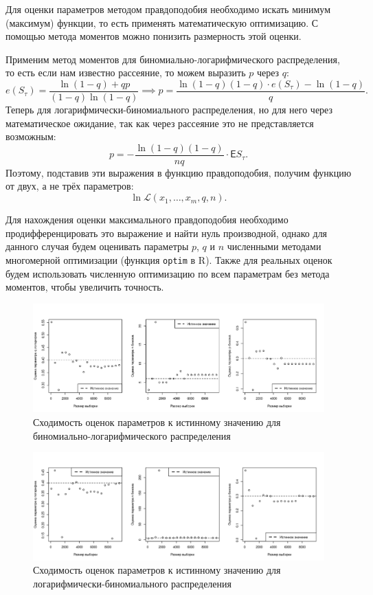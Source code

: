 \documentclass[12pt, specialist, subf, substylefile = spbu.rtx]{disser}
\begin{document}
	Для оценки параметров методом правдоподобия необходимо искать минимум (максимум)  функции, то есть применять математическую оптимизацию. С помощью метода моментов можно понизить размерность этой оценки.
	
	Применим метод моментов для биномиально-логарифмического распределения, то есть если нам известно рассеяние, то можем выразить $ p $ через $ q $:
	\[
		e (S _\tau)=\frac{\ln(1 - q) + q p}{(1-q)\ln(1 - q)} \implies p = \frac {\ln(1 - q) (1 - q) \cdot e(S _\tau) - \ln(1 - q)} {q}.
	\]
	Теперь для логарифмически-биномиального распределения, но для него через математическое ожидание, так как через рассеяние это не представляется возможным:
	\[
		p = -\frac {\ln(1 - q)(1 - q)} {nq} \cdot \mathsf{E} S _\tau.
	\]
	Поэтому, подставив эти выражения в функцию правдоподобия, получим функцию от двух, а не трёх параметров:
	\[
		\ln \mathcal{L} (x _1, \dots, x _m, q, n).
	\]
	
	Для нахождения оценки максимального правдоподобия необходимо продифференцировать это выражение и найти нуль производной, однако для данного случая будем оценивать параметры $ p $, $ q $ и $ n $ численными методами многомерной оптимизации (функция \verb|optim| в R). Также для реальных оценок будем использовать численную оптимизацию по всем параметрам без метода моментов, чтобы увеличить точность.
	
	\begin{figure}[!ht]
		\centering
		\includegraphics[width = 1\textwidth]{binomlogest}
		\caption{Сходимость оценок параметров к истинному значению для биномиально-логарифмического распределения}
		\label{img:binomlogest}
	\end{figure}
	
	\begin{figure}[!ht]
		\centering
		\includegraphics[width = 1\textwidth]{logbinomest}
		\caption{Сходимость оценок параметров к истинному значению для логарифмически-биномиального распределения}
		\label{img:logbinomest}
	\end{figure}
\end{document}
